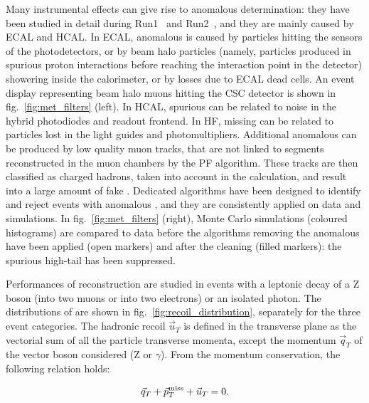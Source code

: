 \noindent Many instrumental effects can give rise to anomalous \MET determination: they have been studied in detail during Run1~\cite{Chatrchyan:2011tn,CMS:vgm} and Run2~\cite{CMS:2016ljj}, and they are mainly caused by ECAL and HCAL. In ECAL, anomalous \met is caused by particles hitting the sensors of the photodetectors, or by beam halo particles (namely, particles produced in spurious proton interactions before reaching the interaction point in the detector) showering inside the calorimeter, or by losses due to ECAL dead cells. An event display representing beam halo muons hitting the CSC detector is shown in fig.~\ref{fig:met_filters} (left). In HCAL, spurious \met can be related to noise in the hybrid photodiodes and readout frontend. In HF, missing \pt can be related to particles lost in the light guides and photomultipliers. Additional anomalous \MET can be produced by low quality muon tracks, that are not linked to segments reconstructed in the muon chambers by the PF algorithm. These tracks are then classified as charged hadrons, taken into account in the \met calculation, and result into a large amount of fake \MET. Dedicated algorithms have been designed to identify and reject events with anomalous \MET, and they are consistently applied on data and simulations. In fig.~\ref{fig:met_filters} (right), Monte Carlo simulations (coloured histograms) are compared to data before the algorithms removing the anomalous \MET have been applied (open markers) and after the cleaning (filled markers): the spurious high-\met tail has been suppressed.

\noindent Performances of \MET reconstruction are studied in events with a leptonic decay of a Z boson (into two muons or into two electrons) or an isolated photon. The distributions of \MET are shown in fig.~\ref{fig:recoil_distribution}, separately for the three event categories. The hadronic recoil $\vec{u}_T$ is defined in the transverse plane as the vectorial sum of all the particle transverse momenta, except the momentum $\vec{q}_T$ of the vector boson considered (Z or $\gamma$). From the momentum conservation, the following relation holds:

\begin{equation}
\vec{q}_T + \vec{p}_T^{\text{miss}} + \vec{u}_T = 0.
\label{eq:recoil_def}
\end{equation}


